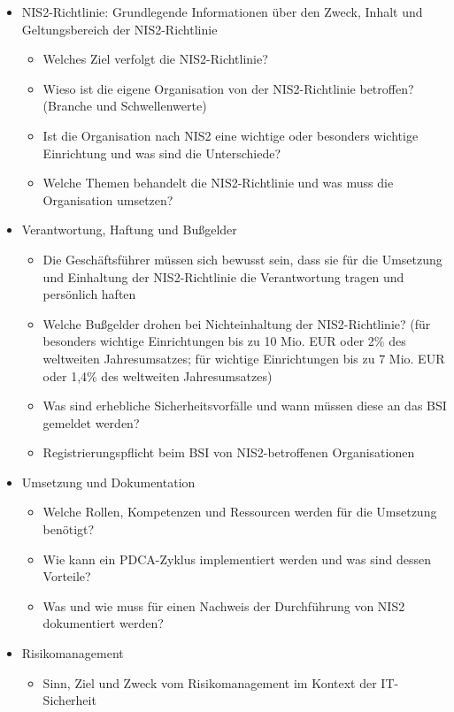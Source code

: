 \begin{itemize}
    \item NIS2-Richtlinie: Grundlegende Informationen über den Zweck, Inhalt und Geltungsbereich der NIS2-Richtlinie \begin{itemize}
        \item Welches Ziel verfolgt die NIS2-Richtlinie?
        \item Wieso ist die eigene Organisation von der NIS2-Richtlinie betroffen? (Branche und Schwellenwerte)
        \item Ist die Organisation nach NIS2 eine wichtige oder besonders wichtige Einrichtung und was sind die Unterschiede?
        \item Welche Themen behandelt die NIS2-Richtlinie und was muss die Organisation umsetzen?
    \end{itemize}
    \item Verantwortung, Haftung und Bußgelder
    \begin{itemize}
        \item Die Geschäftsführer müssen sich bewusst sein, dass sie für die Umsetzung und Einhaltung der NIS2-Richtlinie die Verantwortung tragen und persönlich haften
        \item Welche Bußgelder drohen bei Nichteinhaltung der NIS2-Richtlinie? (für besonders wichtige Einrichtungen bis zu 10 Mio. EUR oder 2\% des weltweiten Jahresumsatzes; für wichtige Einrichtungen bis zu 7 Mio. EUR oder 1,4\% des weltweiten Jahresumsatzes)
        \item Was sind erhebliche Sicherheitsvorfälle und wann müssen diese an das BSI gemeldet werden?
        \item Registrierungspflicht beim BSI von NIS2-betroffenen Organisationen
    \end{itemize}
        \item Umsetzung und Dokumentation
    \begin{itemize}
        \item Welche Rollen, Kompetenzen und Ressourcen werden für die Umsetzung benötigt?
        \item Wie kann ein PDCA-Zyklus implementiert werden und was sind dessen Vorteile?
        \item Was und wie muss für einen Nachweis der Durchführung von NIS2 dokumentiert werden?
    \end{itemize}
    \item Risikomanagement
    \begin{itemize}
        \item Sinn, Ziel und Zweck vom Risikomanagement im Kontext der IT-Sicherheit

\end{itemize}
\end{itemize}
